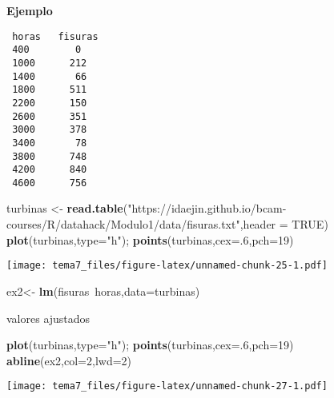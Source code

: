 \documentclass[]{article}
\newenvironment{Shaded}{\begin{snugshade}}{\end{snugshade}}
\newcommand{\KeywordTok}[1]{\textcolor[rgb]{0.13,0.29,0.53}{\textbf{{#1}}}}
\newcommand{\DataTypeTok}[1]{\textcolor[rgb]{0.13,0.29,0.53}{{#1}}}
\newcommand{\DecValTok}[1]{\textcolor[rgb]{0.00,0.00,0.81}{{#1}}}
\newcommand{\StringTok}[1]{\textcolor[rgb]{0.31,0.60,0.02}{{#1}}}
\newcommand{\OtherTok}[1]{\textcolor[rgb]{0.56,0.35,0.01}{{#1}}}
\newcommand{\NormalTok}[1]{{#1}}
\numberwithin{equation}{section}
\begin{document}
\textbf{Ejemplo}

\begin{verbatim}
 horas   fisuras
 400        0
 1000      212
 1400       66
 1800      511
 2200      150
 2600      351
 3000      378
 3400       78
 3800      748
 4200      840
 4600      756
\end{verbatim}

\begin{Shaded}
\begin{Highlighting}[]
\NormalTok{turbinas <-}\StringTok{ }\KeywordTok{read.table}\NormalTok{(}\StringTok{"https://idaejin.github.io/bcam-courses/R/datahack/Modulo1/data/fisuras.txt"}\NormalTok{,}\DataTypeTok{header =} \OtherTok{TRUE}\NormalTok{)}
\KeywordTok{plot}\NormalTok{(turbinas,}\DataTypeTok{type=}\StringTok{"h"}\NormalTok{); }\KeywordTok{points}\NormalTok{(turbinas,}\DataTypeTok{cex=}\NormalTok{.}\DecValTok{6}\NormalTok{,}\DataTypeTok{pch=}\DecValTok{19}\NormalTok{)}
\end{Highlighting}
\end{Shaded}

\texttt{[image: tema7\_files/figure-latex/unnamed-chunk-25-1.pdf]}

\begin{Shaded}
\begin{Highlighting}[]
\NormalTok{ex2<-}\StringTok{ }\KeywordTok{lm}\NormalTok{(fisuras~horas,}\DataTypeTok{data=}\NormalTok{turbinas)}
\end{Highlighting}
\end{Shaded}

valores ajustados

\begin{Shaded}
\end{Shaded}

\begin{Shaded}
\begin{Highlighting}[]
\KeywordTok{plot}\NormalTok{(turbinas,}\DataTypeTok{type=}\StringTok{"h"}\NormalTok{); }\KeywordTok{points}\NormalTok{(turbinas,}\DataTypeTok{cex=}\NormalTok{.}\DecValTok{6}\NormalTok{,}\DataTypeTok{pch=}\DecValTok{19}\NormalTok{)}
\KeywordTok{abline}\NormalTok{(ex2,}\DataTypeTok{col=}\DecValTok{2}\NormalTok{,}\DataTypeTok{lwd=}\DecValTok{2}\NormalTok{)}
\end{Highlighting}
\end{Shaded}

\texttt{[image: tema7\_files/figure-latex/unnamed-chunk-27-1.pdf]}
\end{document}
